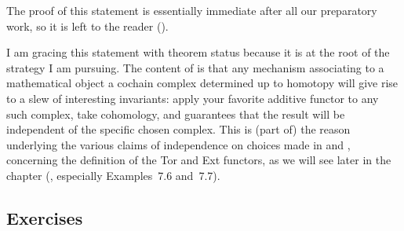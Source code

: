 The proof of this statement is essentially immediate after all our
preparatory work, so it is left to the reader
().

I am gracing this statement with theorem status because it is at the
root of the strategy I am pursuing. The content of 
is that any mechanism associating to a mathematical object a cochain
complex determined up to homotopy will give rise to a slew of
interesting invariants: apply your favorite additive functor to any
such complex, take cohomology, and  guarantees that
the result will be independent of the specific chosen complex. This is
(part of) the reason underlying the various claims of independence on
choices made in  and
, concerning the definition of
the Tor and Ext functors, as we will see later in the chapter
(, especially Examples~7.6
and~7.7).

\subsection*{Exercises}

